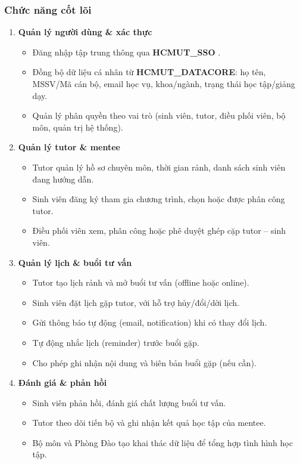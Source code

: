 \subsubsection{Chức năng cốt lõi}

\begin{enumerate}
    \item \textbf{Quản lý người dùng \& xác thực}
    \begin{itemize}
        \item Đăng nhập tập trung thông qua \textbf{HCMUT\_SSO }.
        \item Đồng bộ dữ liệu cá nhân từ \textbf{HCMUT\_DATACORE}: họ tên, MSSV/Mã cán bộ, email học vụ, khoa/ngành, trạng thái học tập/giảng dạy.
        \item Quản lý phân quyền theo vai trò (sinh viên, tutor, điều phối viên, bộ môn, quản trị hệ thống).
    \end{itemize}

    \item \textbf{Quản lý tutor \& mentee}
    \begin{itemize}
        \item Tutor quản lý hồ sơ chuyên môn, thời gian rảnh, danh sách sinh viên đang hướng dẫn.
        \item Sinh viên đăng ký tham gia chương trình, chọn hoặc được phân công tutor.
        \item Điều phối viên xem, phân công hoặc phê duyệt ghép cặp tutor -- sinh viên.
    \end{itemize}

    \item \textbf{Quản lý lịch \& buổi tư vấn}
    \begin{itemize}
        \item Tutor tạo lịch rảnh và mở buổi tư vấn (offline hoặc online).
        \item Sinh viên đặt lịch gặp tutor, với hỗ trợ hủy/đổi/dời lịch.
        \item Gửi thông báo tự động (email, notification) khi có thay đổi lịch.
        \item Tự động nhắc lịch (reminder) trước buổi gặp.
        \item Cho phép ghi nhận nội dung và biên bản buổi gặp (nếu cần).
    \end{itemize}

    \item \textbf{Đánh giá \& phản hồi}
    \begin{itemize}
        \item Sinh viên phản hồi, đánh giá chất lượng buổi tư vấn.
        \item Tutor theo dõi tiến bộ và ghi nhận kết quả học tập của mentee.
        \item Bộ môn và Phòng Đào tạo khai thác dữ liệu để tổng hợp tình hình học tập.
    \end{itemize}


\end{enumerate}
